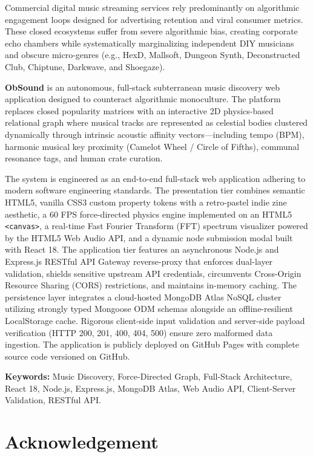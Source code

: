\documentclass[12pt,a4paper,oneside]{report}
\begin{document}
Commercial digital music streaming services rely predominantly on algorithmic engagement loops designed for advertising retention and viral consumer metrics. These closed ecosystems suffer from severe algorithmic bias, creating corporate echo chambers while systematically marginalizing independent DIY musicians and obscure micro-genres (e.g., HexD, Mallsoft, Dungeon Synth, Deconstructed Club, Chiptune, Darkwave, and Shoegaze).

\textbf{ObSound} is an autonomous, full-stack subterranean music discovery web application designed to counteract algorithmic monoculture. The platform replaces closed popularity matrices with an interactive 2D physics-based relational graph where musical tracks are represented as celestial bodies clustered dynamically through intrinsic acoustic affinity vectors---including tempo (BPM), harmonic musical key proximity (Camelot Wheel / Circle of Fifths), communal resonance tags, and human crate curation.

The system is engineered as an end-to-end full-stack web application adhering to modern software engineering standards. The presentation tier combines semantic HTML5, vanilla CSS3 custom property tokens with a retro-pastel indie zine aesthetic, a 60 FPS force-directed physics engine implemented on an HTML5 \texttt{<canvas>}, a real-time Fast Fourier Transform (FFT) spectrum visualizer powered by the HTML5 Web Audio API, and a dynamic node submission modal built with React 18. The application tier features an asynchronous Node.js and Express.js RESTful API Gateway reverse-proxy that enforces dual-layer validation, shields sensitive upstream API credentials, circumvents Cross-Origin Resource Sharing (CORS) restrictions, and maintains in-memory caching. The persistence layer integrates a cloud-hosted MongoDB Atlas NoSQL cluster utilizing strongly typed Mongoose ODM schemas alongside an offline-resilient LocalStorage cache. Rigorous client-side input validation and server-side payload verification (HTTP 200, 201, 400, 404, 500) ensure zero malformed data ingestion. The application is publicly deployed on GitHub Pages with complete source code versioned on GitHub.

\vspace{0.4cm}
\noindent \textbf{Keywords:} Music Discovery, Force-Directed Graph, Full-Stack Architecture, React 18, Node.js, Express.js, MongoDB Atlas, Web Audio API, Client-Server Validation, RESTful API.

\vspace{0.8cm}
\section*{Acknowledgement}
\end{document}
